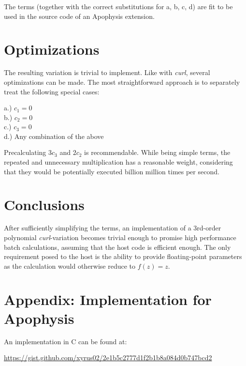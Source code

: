 \documentclass[]{article}
\begin{document}
\noindent The terms (together with the correct substitutions for a, b, c, d) are fit to be used in the source code of an Apophysis extension.

\section{Optimizations}

The resulting variation is trivial to implement. Like with \emph{curl}, several optimizations can be made. The most straightforward approach is to separately treat the following special cases:

\begin{flushleft}
	\hspace{20pt} a.) $c_1 = 0$ \\	
	\hspace{20pt} b.) $c_2 = 0$ \\
	\hspace{20pt} c.) $c_3 = 0$ \\
	\hspace{20pt} d.) Any combination of the above \\
\end{flushleft}	

\noindent Precalculating $3c_3$ and $2c_2$ is recommendable. While being simple terms, the repeated and unnecessary multiplication has a reasonable weight, considering that they would be potentially executed billion million times per second.

\section{Conclusions}

After sufficiently simplifying the terms, an implementation of a 3rd-order polynomial \emph{curl}-variation becomes trivial enough to promise high performance batch calculations, assuming that the host code is efficient enough. The only requirement posed to the host is the ability to provide floating-point parameters as the calculation would otherwise reduce to $f(z) = z$.

\section{Appendix: Implementation for Apophysis}

An implementation in C can be found at:
\begin{flushleft}
	\hspace{20pt}\url{https://gist.github.com/xyrus02/2e1b5c2777d1f2b1b8a084d0b747bcd2}
\end{flushleft}
\end{document}
